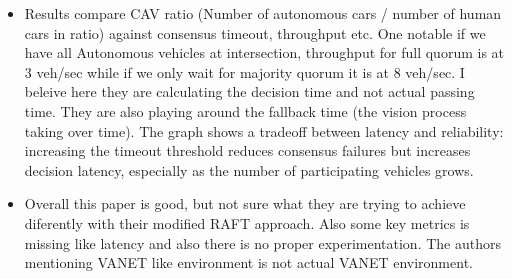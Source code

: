 \documentclass[fleqn,10pt]{olplainarticle}
\begin{document}
\begin{itemize}
a Leader Election by sending a Leader Election Request
message to all other vehicles. At this point, the Candidate
is referred to as a F in-Candidate. Upon receiving this
Leader Election Request, each recipient vehicle compares its
own vote count with that of the F in-Candidate (the sender
of the request). If the F in-Candidate has more votes, the
recipient sends an ”acknowledged” response; otherwise, it
replies with ”ignored.” If both vote counts are equal, the
recipient compares election-time and acknowledges the vehicle
that reached quorum earlier. \textbf{Here only leader goes.}
        \item Results compare CAV ratio (Number of autonomous cars / number of human cars in ratio) against consensus timeout, throughput etc. One notable if we have all Autonomous vehicles at intersection, throughput for full quorum is at 3 veh/sec while if we only wait for majority quorum it is at 8 veh/sec. I beleive here they are calculating the decision time and not actual passing time. They are also playing around the fallback time (the vision process taking over time). The graph shows a tradeoff between latency and reliability: increasing the timeout threshold reduces consensus failures but increases decision latency, especially as the number of participating vehicles grows.
        \item Overall this paper is good, but not sure what they are trying to achieve diferently with their modified RAFT approach. Also some key metrics is missing like latency and also there is no proper experimentation. The authors mentioning VANET like environment is not actual VANET environment.
   \end{itemize}
\end{document}
